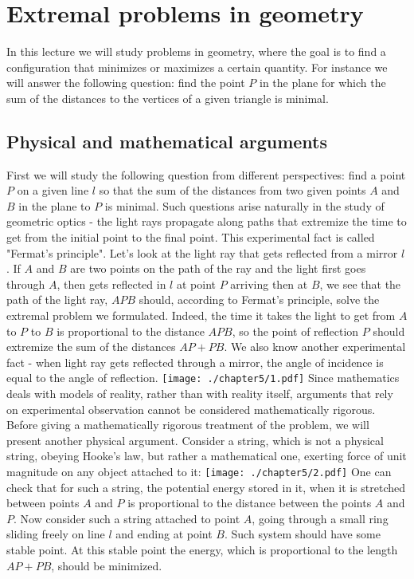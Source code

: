 \chapter{Extremal problems in geometry}
In this lecture we will study problems in geometry, where the goal is to find a configuration that minimizes or maximizes a certain quantity. For instance we will answer the following question: find the point $P$ in the plane for which the sum of the distances to the vertices of a given triangle is minimal.
\section{Physical and mathematical arguments}
First we will study the following question from different perspectives: find a point $P$ on a given line $l$ so that the sum of the distances from two given points $A$ and $B$ in the plane to $P$ is minimal.
Such questions arise naturally in the study of geometric optics - the light rays propagate along paths that extremize the time to get from the initial point to the final point. This experimental fact is called "Fermat's principle".
Let's look at the light ray that gets reflected from a mirror $l$.
If $A$ and $B$ are two points on the path of the ray and the light first goes through $A$, then gets reflected in $l$ at point $P$ arriving then at $B$, we see that the path of the light ray, $APB$ should, according to Fermat's principle, solve the extremal problem we formulated. Indeed, the time it takes the light to get from $A$ to $P$ to $B$ is proportional to the distance $APB$, so the point of reflection $P$ should extremize the sum of the distances $AP+PB$.
We also know another experimental fact - when light ray gets reflected through a mirror, the angle of incidence is equal to the angle of reflection.
\texttt{[image: ./chapter5/1.pdf]}
Since mathematics deals with models of reality, rather than with reality itself, arguments that rely on experimental observation cannot be considered mathematically rigorous.
Before giving a mathematically rigorous treatment of the problem, we will present another physical argument.
Consider a string, which is not a physical string, obeying Hooke's law, but rather a mathematical one, exerting force of unit magnitude on any object attached to it:
\texttt{[image: ./chapter5/2.pdf]}
One can check that for such a string, the potential energy stored in it, when it is stretched between points $A$ and $P$ is proportional to the distance between the points $A$ and $P$.
Now consider such a string attached to point $A$, going through a small ring sliding freely on line $l$ and ending at point $B$. Such system should have some stable point. At this stable point the energy, which is proportional to the length $AP+PB$, should be minimized.
